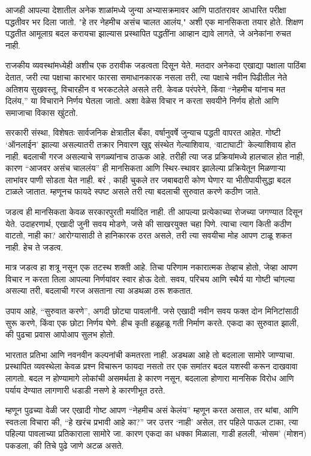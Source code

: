 आजही आपल्या देशातील अनेक शाळांमध्ये जुन्या अभ्यासक्रमावर आणि पाठांतरावर आधारित परीक्षा पद्धतीवर भर दिला जातो. "हे तर नेहमीच असंच चालत आलंय," अशी एक मानसिकता तयार होते. शिक्षण पद्धतीत आमूलाग्र बदल करायचा झाल्यास प्रस्थापित पद्धतींना आव्हान द्यावे लागते, जे अनेकांना रुचत नाही.

राजकीय व्यवस्थांमध्येही अशीच एक ठरावीक जडत्वता दिसून येते. मतदार अनेकदा एखाद्या पक्षाला पाठिंबा देतात, जरी त्या पक्षाचा कारभार फारसा समाधानकारक नसला तरी, त्या पक्षाचे नवीन पिढीतील नेते अतिशय सुखवस्तू, विचारहीन व भरकटलेले असले तरी. केवळ परंपरेने, किंवा “नेहमीच यांनाच मत दिलंय,” या विचाराने निर्णय घेतला जातो. अशा वेळेस विचार न करता सवयीने निर्णय होतो आणि समाजाचा विकास खुंटतो.

सरकारी संस्था, विशेषतः सार्वजनिक क्षेत्रातील बँका, वर्षानुवर्षे जुन्याच पद्धती वापरत आहेत. गोष्टी ‘ऑनलाईन’ झाल्या असल्यातरी तक्रार निवारण खुद्द संस्थेत गेल्याशिवाय, ‘वाटाघाटी’ केल्याशिवाय होत नाही. बदलाची गरज असल्याचे सगळ्यांनाच ठाऊक आहे. तरीही त्या जड प्रक्रियांमध्ये हालचाल होत नाही, कारण “आजवर असंच चाललंय” ही मानसिकता आणि स्थिर-स्थावर झालेल्या प्रक्रियेतून मिळणाऱ्या लाभांवर पाणी सोडता येत नाही.  बरं , काही चुकले तर जबाबदारी कोण घेणार या भीतीपायीसुद्धा बदल टाळले जातात. म्हणूनच फायदे स्पष्ट असले तरी त्या बदलाची सुरुवात करणे कठीण जाते.

जडत्व ही मानसिकता केवळ सरकारपुरती मर्यादित नाही. ती आपल्या प्रत्येकाच्या रोजच्या जगण्यात दिसून येते. उदाहरणार्थ, एखादी जुनी सवय मोडणे, जसे की साखरयुक्त चहा पिणे. त्याचा त्याग किती कठीण वाटतो, नाही का? आरोग्यासाठी ते हानिकारक ठरत असले, तरी त्या सवयीचा मोह आपण टाळू शकत नाही. हेच ते जडत्व.

मात्र जडत्व हा शत्रू नसून एक तटस्थ शक्ती आहे. तिचा परिणाम नकारात्मक तेव्हाच होतो, जेव्हा आपण विचार न करता तिला आपल्या निर्णयांवर स्वार होऊ देतो. सवय, परिचय आणि स्थैर्य या गोष्टी चांगल्या असल्या तरी, बदलाची गरज असताना त्या अडथळा ठरू शकतात.

उपाय आहे, “सुरुवात करणे”, अगदी छोट्या पावलांनी. जसे एखादी नवीन सवय फक्त दोन मिनिटांसाठी सुरू करणे, किंवा एक छोटा निर्णय घेणे. हीच कृती हळूहळू गती निर्माण करते. एकदा का सुरुवात झाली, की पुढचा प्रवास आपोआप सुलभ होतो.

भारतात प्रतिभा आणि नवनवीन कल्पनांची कमतरता नाही. अडथळा आहे तो बदलाला सामोरे जाण्याचा. प्रस्थापित व्यवस्थेला केवळ प्रश्न विचारून फायदा नसतो तर एक समांतर बदल यशस्वी करून दाखवावा लागतो.  बदल न होण्यामागे लोकांची असमर्थता हे कारण नसून, बदलाला होणारा मानसिक विरोध आणि पर्याय देण्यात लागणारी धडाडी नसणे हे कारणीभूत ठरते.

म्हणून पुढच्या वेळी जर एखादी गोष्ट आपण “नेहमीच असं केलंय” म्हणून करत असाल, तर थांबा, आणि स्वतःला विचारा की, “हे खरंच प्रभावी आहे का?” जर उत्तर ‘नाही’ असेल, तर पहिले पाऊल टाका, त्या पहिल्या पावलाच्या प्रतिकाराला सामोरे जा. कारण एकदा का धक्का मिळाला, गाडी हलली, ‘मोसम’ (मोशन) पकडला, की तिचे पुढे जाणे अटळ असते.

